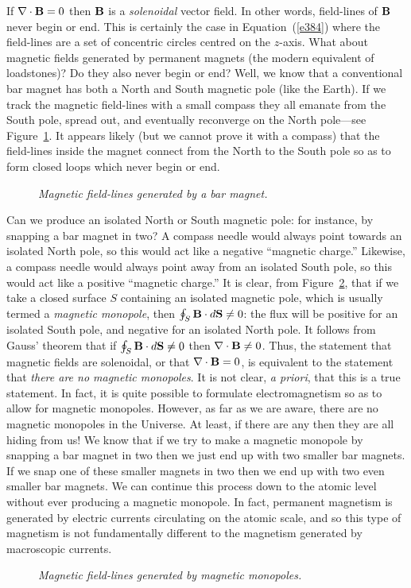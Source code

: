 If  $\nabla\cdot {\bf B}=0$ then  ${\bf B}$ is a
{\em solenoidal} vector field. In other words,  field-lines of ${\bf B}$
never begin or end.  This is certainly the
case in Equation~(\ref{e384}) where the field-lines are a set of concentric circles centred
on the $z$-axis.  What about magnetic
fields generated by permanent magnets (the modern equivalent of loadstones)?
Do they also never begin or end? Well, we know that a conventional bar
magnet has both a North and South magnetic pole (like the Earth). If we track the
magnetic field-lines with a small compass they  all emanate from the South
pole, spread out, and eventually reconverge on the North pole---see Figure~\ref{f30}. It appears likely
(but we cannot prove it with a compass) that the field-lines inside the magnet
connect from the North to the South pole so as to form closed loops which never begin or end.
\begin{figure}
\epsfysize=2.5in
\centerline{}
\caption{\em Magnetic field-lines generated by a bar magnet.}\label{f30}
\end{figure}

Can we produce an isolated North or South magnetic pole: for instance, by snapping
a bar magnet in two? A compass needle would always point towards an isolated
North pole, so this would act  like a negative ``magnetic charge.'' 
Likewise, a compass needle would always point away from an isolated South
pole, so this would act like a positive ``magnetic charge.'' 
It is clear, from Figure~\ref{f31},
that if we take  a closed surface $S$ containing an isolated
magnetic pole, which is usually termed a {\em magnetic monopole}, then 
$\oint_S {\bf B}\cdot d{\bf S} \neq 0$: the flux will be positive for an isolated
South pole, and negative for an isolated North pole. 
It follows from Gauss'
theorem that if $\oint_S {\bf B}\cdot d{\bf S} \neq 0$ then $\nabla\cdot{\bf B}
\neq 0$. Thus, the  statement that magnetic fields are solenoidal, or that
$\nabla\cdot{\bf B} = 0$, is equivalent to  the statement that {\em
there are no magnetic monopoles}. It is not clear, {\em a priori}, that this is
a true statement. In fact, it is quite possible to formulate electromagnetism so as to
allow for magnetic monopoles. However, as far as we are aware, there are no  magnetic
monopoles in the Universe. 
At least, if there are any then they are all 
hiding from us!
We know that if we try to make a magnetic monopole  by snapping a bar magnet in two
then we just end up with two smaller bar magnets. If we snap one of these smaller
magnets in two then we end up with two even smaller bar magnets. We can continue
this process down to the atomic level without ever producing a magnetic monopole.
In fact, permanent magnetism 
is generated by electric currents circulating on the atomic
scale, and so this type of
magnetism is not fundamentally different to the magnetism generated
by macroscopic currents. 
\begin{figure}
\epsfysize=2.25in
\centerline{}
\caption{\em Magnetic field-lines generated by magnetic monopoles.}\label{f31}
\end{figure}

